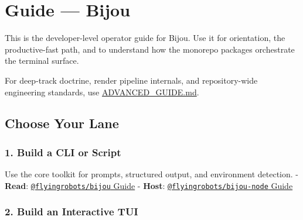 \chapter{Guide --- Bijou}\label{record-008}

\smallskip

This is the developer-level operator guide for Bijou. Use it for orientation, the productive-fast path, and to understand how the monorepo packages orchestrate the terminal surface.

For deep-track doctrine, render pipeline internals, and repository-wide engineering standards, use \href{https://github.com/flyingrobots/bijou/blob/cbd70612140e7a450d764b3c7be1c6af878b99bc/ADVANCED_GUIDE.md}{ADVANCED\_GUIDE.md}.

\section{Choose Your Lane}\label{record-008-choose-your-lane}

\subsection{1. Build a CLI or Script}\label{record-008-build-a-cli-or-script}

Use the core toolkit for prompts, structured output, and environment detection. - \textbf{Read}: \href{https://github.com/flyingrobots/bijou/blob/cbd70612140e7a450d764b3c7be1c6af878b99bc/packages/bijou/GUIDE.md}{\texttt{@\allowbreak{}f\allowbreak{}l\allowbreak{}y\allowbreak{}i\allowbreak{}n\allowbreak{}g\allowbreak{}r\allowbreak{}o\allowbreak{}b\allowbreak{}o\allowbreak{}t\allowbreak{}s\allowbreak{}/\allowbreak{}b\allowbreak{}i\allowbreak{}j\allowbreak{}o\allowbreak{}u} Guide} - \textbf{Host}: \href{https://github.com/flyingrobots/bijou/blob/cbd70612140e7a450d764b3c7be1c6af878b99bc/packages/bijou-node/GUIDE.md}{\texttt{@\allowbreak{}f\allowbreak{}l\allowbreak{}y\allowbreak{}i\allowbreak{}n\allowbreak{}g\allowbreak{}r\allowbreak{}o\allowbreak{}b\allowbreak{}o\allowbreak{}t\allowbreak{}s\allowbreak{}/\allowbreak{}b\allowbreak{}i\allowbreak{}j\allowbreak{}o\allowbreak{}u\allowbreak{}-\allowbreak{}n\allowbreak{}o\allowbreak{}d\allowbreak{}e} Guide}

\subsection{2. Build an Interactive TUI}\label{record-008-build-an-interactive-tui}

